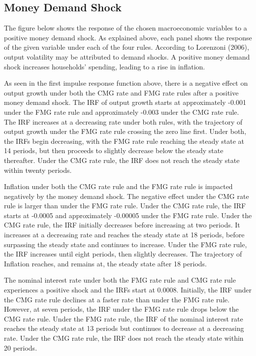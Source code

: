 \documentclass[11pt,preprint, authoryear]{elsarticle}
\numberwithin{equation}{section}
\numberwithin{figure}{section}
\numberwithin{table}{section}
\begin{document}
\hypertarget{money-demand-shock}{%
\subsection{Money Demand Shock}\label{money-demand-shock}}

The figure below shows the response of the chosen macroeconomic
variables to a positive money demand shock. As explained above, each
panel shows the response of the given variable under each of the four
rules. According to Lorenzoni (2006), output volatility may be
attributed to demand shocks. A positive money demand shock increases
households' spending, leading to a rise in inflation.

As seen in the first impulse response function above, there is a
negative effect on output growth under both the CMG rate and FMG rate
rules after a positive money demand shock. The IRF of output growth
starts at approximately -0.001 under the FMG rate rule and approximately
-0.003 under the CMG rate rule. The IRF increases at a decreasing rate
under both rules, with the trajectory of output growth under the FMG
rate rule crossing the zero line first. Under both, the IRFs begin
decreasing, with the FMG rate rule reaching the steady state at 14
periods, but then proceeds to slightly decrease below the steady state
thereafter. Under the CMG rate rule, the IRF does not reach the steady
state within twenty periods.

Inflation under both the CMG rate rule and the FMG rate rule is impacted
negatively by the money demand shock. The negative effect under the CMG
rate rule is larger than under the FMG rate rule. Under the CMG rate
rule, the IRF starts at -0.0005 and approximately -0.00005 under the FMG
rate rule. Under the CMG rate rule, the IRF initially decreases before
increasing at two periods. It increases at a decreasing rate and reaches
the steady state at 18 periods, before surpassing the steady state and
continues to increase. Under the FMG rate rule, the IRF increases until
eight periods, then slightly decreases. The trajectory of Inflation
reaches, and remains at, the steady state after 18 periods.

The nominal interest rate under both the FMG rate rule and CMG rate rule
experiences a positive shock and the IRFs start at 0.0008. Initially,
the IRF under the CMG rate rule declines at a faster rate than under the
FMG rate rule. However, at seven periods, the IRF under the FMG rate
rule drops below the CMG rate rule. Under the FMG rate rule, the IRF of
the nominal interest rate reaches the steady state at 13 periods but
continues to decrease at a decreasing rate. Under the CMG rate rule, the
IRF does not reach the steady state within 20 periods.
\end{document}
